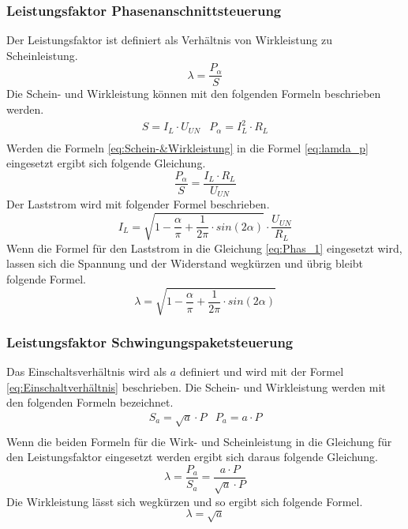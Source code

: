 \subsubsection{Leistungsfaktor Phasenanschnittsteuerung}
Der Leistungsfaktor ist definiert als Verhältnis von Wirkleistung zu Scheinleistung. 
\begin{equation}\label{eq:lamda_p}
\lambda = \frac{P_{\alpha}}{S}
\end{equation}
Die Schein- und Wirkleistung können mit den folgenden Formeln beschrieben werden.
\begin{equation}\label{eq:Schein-&Wirkleistung}
\begin{array}{cc} 
S = I_L \cdot U_{UN}   &   P_{\alpha} = I_L^2 \cdot R_L  \\
\end{array}
\end{equation}
Werden die Formeln \ref{eq:Schein-&Wirkleistung} in die Formel \ref{eq:lamda_p} eingesetzt ergibt sich folgende Gleichung. 
\begin{equation} \label{eq:Phas_1}
\frac{P_{\alpha}}{S} = \frac{I_L \cdot R_L}{U_{UN}}
\end{equation}
Der Laststrom wird mit folgender Formel beschrieben.
\begin{equation}
I_L = \sqrt{1-\frac{\alpha}{\pi}+\frac{1}{2\pi} \cdot sin(2\alpha)} \cdot \frac{U_{UN}}{R_L}
\end{equation}
Wenn die Formel für den Laststrom in die Gleichung \ref{eq:Phas_1} eingesetzt wird, lassen sich die Spannung und der Widerstand wegkürzen und übrig bleibt folgende Formel.
\begin{equation}\label{eq:lamda_p_n}
\lambda = \sqrt{1-\frac{\alpha}{\pi}+\frac{1}{2\pi} \cdot sin(2\alpha)}
\end{equation}

\subsubsection{Leistungsfaktor Schwingungspaketsteuerung}
Das Einschaltsverhältnis wird als $a$ definiert und wird mit der Formel \ref{eq:Einschaltverhältnis} beschrieben.
Die Schein- und Wirkleistung werden mit den folgenden Formeln bezeichnet.
\begin{equation}\label{eq:Schw_Schein-&Wirkleistung}
\begin{array}{cc} 
S_a = \sqrt{a} \cdot P  &   P_a = a \cdot P \\
\end{array}
\end{equation} 
Wenn die beiden Formeln für die Wirk- und Scheinleistung in die Gleichung für den Leistungsfaktor eingesetzt werden ergibt sich daraus folgende Gleichung.  
\begin{equation}
\lambda = \frac{P_a }{S_a} = \frac{a \cdot P}{\sqrt{a} \cdot P}
\end{equation}
Die Wirkleistung lässt sich wegkürzen und so ergibt sich folgende Formel.
\begin{equation}\label{eq:lamda_s_n}
\lambda = \sqrt{a}
\end{equation}

